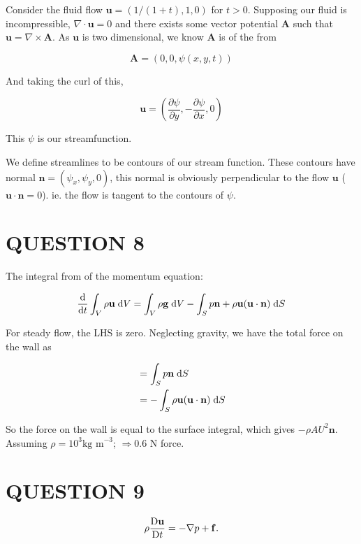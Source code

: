 \documentclass[a4paper]{article}
\begin{document}
Consider the fluid flow $ \mathbf{u} = (  1/(1+t),1,0 ) $ for $ t > 0 $. Supposing our fluid is incompressible, $ \nabla \cdot \mathbf{u} = 0 $ and there exists some vector potential $ \mathbf{A} $ such that $ \mathbf{u} = \nabla  \times \mathbf{A} $. As $ \mathbf{u} $ is two dimensional, we know $ \mathbf{A} $ is of the from

\[ \mathbf{A} = (0,0,\psi(x,y,t)) \]

And taking the curl of this, 

\[ \mathbf{u} = ( \frac{\partial \psi }{\partial y}, - \frac{\partial \psi }{\partial x}, 0 ) \]

This $ \psi $ is our streamfunction.

We define streamlines to be contours of our stream function. These contours have normal $ \mathbf{n} = ( \psi_{x},\psi_{y},0 ) $, this normal is obviously perpendicular to the flow $ \mathbf{u} $ ($ \mathbf{u} \cdot \mathbf{n} = 0 $). ie. the flow is tangent to the contours of $ \psi$. 

\section{QUESTION 8}


The integral from of the momentum equation:

\[ \frac{\mathrm{d} }{\mathrm{d} t}  \int_{V}  \rho \mathbf{u} \; \mathrm{d} V = \int_{V} \rho \mathbf{g} \; \mathrm{d} V - \int_{S} p \mathbf{n} + \rho \mathbf{u} (\mathbf{u} \cdot \mathbf{n}) \; \mathrm{d} S \]

For steady flow, the LHS is zero. Neglecting gravity, we have the total force on the wall as 

\begin{align*}
& = \int_{S} p \mathbf{n} \; \mathrm{d} S \\
& = - \int_{S} \rho \mathbf{u} (\mathbf{u} \cdot \mathbf{n}) \; \mathrm{d} S 
\end{align*}

So the force on the wall is equal to the surface integral, which gives $ - \rho A U^{2} \mathbf{n} $. Assuming $ \rho = 10^{3} \text{kg m}^{-3} $; $ \Rightarrow 0.6 $ N force. 



\section{QUESTION 9}

\begin{prop}
	\[
	\rho \frac{\mathrm{D} \mathbf{u}}{\mathrm{D} t} = - \nabla p + \mathbf{f}.
	\]
\end{prop}
\end{document}
